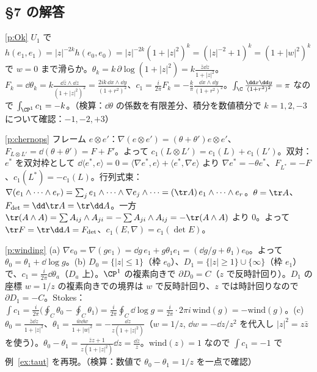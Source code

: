 \subsection*{§7 の解答}
\begin{sol}{\ref{p:Ok}}
$U_1$ で $h(e_1,e_1)=|z|^{-2k}h(e_0,e_0)=|z|^{-2k}(1+|z|^2)^k=(|z|^{-2}+1)^k=(1+|w|^2)^k$ で $w=0$ まで滑らか。$\theta_k=k\,\partial\log(1+|z|^2)=k\frac{\bar z\dd z}{1+|z|^2}$。$F_k=\dd\theta_k=k\frac{\dd\bar z\wedge\dd z}{(1+|z|^2)^2}=\frac{2ik\,\dd x\wedge\dd y}{(1+r^2)^2}$、$c_1=\frac i{2\pi}F_k=-\frac k\pi\frac{\dd x\wedge\dd y}{(1+r^2)^2}$。$\int_{\C}\frac{\dd x\dd y}{(1+r^2)^2}=\pi$ なので $\int_{\CP^1}c_1=-k$。（検算：$\dd\theta$ の係数を有限差分、積分を数値積分で $k=1,2,-3$ について確認：$-1,-2,+3$）
\end{sol}
\begin{sol}{\ref{p:chernops}}
フレーム $e\otimes e'$：$\nabla(e\otimes e')=(\theta+\theta')e\otimes e'$、$F_{L\otimes L'}=\dd(\theta+\theta')=F+F'$。よって $c_1(L\otimes L')=c_1(L)+c_1(L')$。双対：$e^*$ を双対枠として $\dd\langle e^*,e\rangle=0=\langle\nabla e^*,e\rangle+\langle e^*,\nabla e\rangle$ より $\nabla e^*=-\theta e^*$、$F_{L^*}=-F$、$c_1(L^*)=-c_1(L)$。行列式束：$\nabla(e_1\wedge\dots\wedge e_r)=\sum_je_1\wedge\dots\wedge\nabla e_j\wedge\dots=(\tr A)\,e_1\wedge\dots\wedge e_r$。$\theta=\tr A$、$F_{\det}=\dd\tr A=\tr\dd A$。一方 $\tr(A\wedge A)=\sum A_{ij}\wedge A_{ji}=-\sum A_{ji}\wedge A_{ij}=-\tr(A\wedge A)$ より $0$。よって $\tr F=\tr\dd A=F_{\det}$、$c_1(E,\nabla)=c_1(\det E)$。
\end{sol}
\begin{sol}{\ref{p:winding}}
(a) $\nabla e_0=\nabla(ge_1)=\dd g\,e_1+g\theta_1e_1=(\dd g/g+\theta_1)e_0$。よって $\theta_0=\theta_1+\dd\log g$。(b) $D_0=\{|z|\le1\}$（枠 $e_0$）、$D_1=\{|z|\ge1\}\cup\{\infty\}$（枠 $e_1$）で、$c_1=\frac i{2\pi}\dd\theta_a$（$D_a$ 上）。$\CP^1$ の複素向きで $\partial D_0=C$（$z$ で反時計回り）。$D_1$ の座標 $w=1/z$ の複素向きでの境界は $w$ で反時計回り、$z$ では時計回りなので $\partial D_1=-C$。Stokes：$\int c_1=\frac i{2\pi}\bigl(\oint_C\theta_0-\oint_C\theta_1\bigr)=\frac i{2\pi}\oint_C\dd\log g=\frac i{2\pi}\cdot2\pi i\,\mathrm{wind}(g)=-\mathrm{wind}(g)$。(c) $\theta_0=\frac{\bar z\dd z}{1+|z|^2}$、$\theta_1=\frac{\bar w\dd w}{1+|w|^2}=-\frac{\dd z}{z(1+|z|^2)}$（$w=1/z$, $\dd w=-\dd z/z^2$ を代入し $|z|^2=z\bar z$ を使う）。$\theta_0-\theta_1=\frac{\bar z z+1}{z(1+|z|^2)}\dd z=\frac{\dd z}z$。$\mathrm{wind}(z)=1$ なので $\int c_1=-1$ で例~\ref{ex:taut} を再現。（検算：数値で $\theta_0-\theta_1=1/z$ を一点で確認）
\end{sol}
